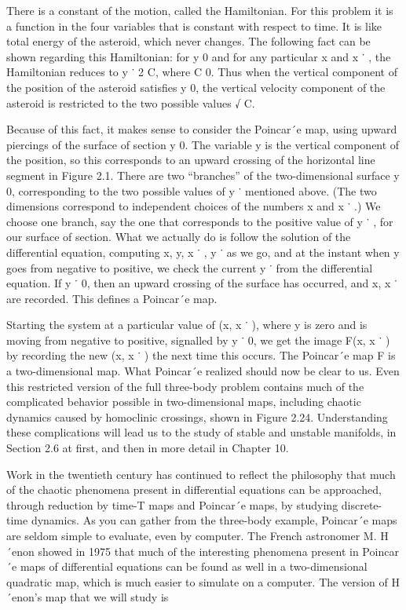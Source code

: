 \documentclass[12pt]{article}
\begin{document}
There is a constant of the motion, called the Hamiltonian. For this problem it is a function in the four variables that is constant 
with respect to time. It is like total energy of the asteroid, which never changes. The following fact can be shown regarding this 
Hamiltonian: for y  0 and for any particular x and x ˙ , the Hamiltonian reduces to y ˙ 2  C, where C 
 0. Thus when the vertical component of the position of the asteroid satisﬁes y  0, the vertical velocity component of the asteroid 
is restricted to the two possible values  √ C.

Because of this fact, it makes sense to consider the Poincar´e map, using upward piercings of the surface of section y  0. The 
variable y is the vertical component of the position, so this corresponds to an upward crossing of the horizontal line segment in 
Figure 2.1. There are two “branches” of the two-dimensional surface y  0, corresponding to the two possible values of y ˙ mentioned 
above. (The two dimensions correspond to independent choices of the numbers x and x ˙ .) We choose one branch, say the one that 
corresponds to the positive value of y ˙ , for our surface of section. What we actually do is follow the solution of the differential 
equation, computing x, y, x ˙ , y ˙ as we go, and at the instant when y goes from negative to positive, we check the current y ˙ from 
the differential equation. If y ˙  0, then an upward crossing of the surface has occurred, and x, x ˙ are recorded. This deﬁnes a 
Poincar´e map.

Starting the system at a particular value of (x, x ˙ ), where y is zero and is moving from negative to positive, signalled by y ˙  0, 
we get the image F(x, x ˙ ) by recording the new (x, x ˙ ) the next time this occurs. The Poincar´e map F is a two-dimensional map. 
What Poincar´e realized should now be clear to us. Even this restricted version of the full three-body problem contains much of the 
complicated behavior possible in two-dimensional maps, including chaotic dynamics caused by homoclinic crossings, shown in Figure 
2.24. Understanding these complications will lead us to the study of stable and unstable manifolds, in Section 2.6 at ﬁrst, and then 
in more detail in Chapter 10.

Work in the twentieth century has continued to reﬂect the philosophy that much of the chaotic phenomena present in differential 
equations can be approached, through reduction by time-T maps and Poincar´e maps, by studying discrete-time dynamics. As you can 
gather from the three-body example, Poincar´e maps are seldom simple to evaluate, even by computer. The French astronomer M. H´enon 
showed in 1975 that much of the interesting phenomena present in Poincar´e maps of differential equations can be found as well in a 
two-dimensional quadratic map, which is much easier to simulate on a computer. The version of H´enon’s map that we will study is
\end{document}
